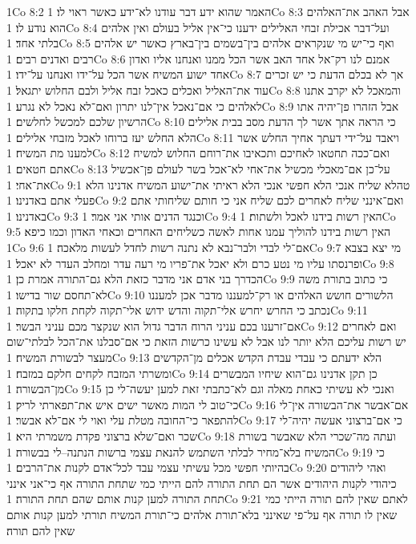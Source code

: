 1Co 8:2  האמר שהוא ידע דבר עודנו לא־ידע כאשר ראוי לו׃
1Co 8:3  אבל האהב את־האלהים הוא נודע לו׃
1Co 8:4  ועל־דבר אכילת זבחי האלילים ידענו כי־אין אליל בעולם ואין אלהים בלתי אחד׃
1Co 8:5  ואף כי־יש מי שנקראים אלהים בין־בשמים בין־בארץ כאשר יש אלהים רבים ואדנים רבים׃
1Co 8:6  אמנם לנו רק־אל אחד האב אשר הכל ממנו ואנחנו אליו ואדון אחד ישוע המשיח אשר הכל על־ידו ואנחנו על־ידו׃
1Co 8:7  אך לא בכלם הדעת כי יש זכרים עוד את־האליל ואכלים כאכל זבח אליל ולבם החלוש יתגאל׃
1Co 8:8  והמאכל לא יקרב אתנו לאלהים כי אם־נאכל אין־לנו יתרון ואם־לא נאכל לא נגרע׃
1Co 8:9  אבל הזהרו פן־יהיה אתו הרשיון שלכם למכשל לחלשים׃
1Co 8:10  כי הראה אתך אשר לך הדעת מסב בבית אלילים הלא החלש יעז ברוחו לאכל מזבחי אלילים׃
1Co 8:11  ויאבד על־ידי דעתך אחיך החלש אשר למענו מת המשיח׃
1Co 8:12  ואם־ככה תחטאו לאחיכם ותכאיבו את־רוחם החלוש למשיח אתם חטאים׃
1Co 8:13  על־כן אם־מאכלי מכשיל את־אחי לא־אכל בשר לעולם פן־אכשיל את־אחי׃
1Co 9:1  טהלא שליח אנכי הלא חפשי אנכי הלא ראיתי את־ישוע המשיח אדנינו הלא פעלי אתם באדנינו׃
1Co 9:2  ואם־אינני שליח לאחרים לכם שליח אני כי חותם שליחותי אתם באדנינו׃
1Co 9:3  וכנגד הדנים אותי אני אמר׃
1Co 9:4  האין רשות בידנו לאכל ולשתות׃
1Co 9:5  האין רשות בידנו להוליך עמנו אחות לאשה כשליחים האחרים וכאחי האדון וכמו כיפא׃
1Co 9:6  אם־לי לבדי ולבר־נבא לא נתנה רשות לחדל לעשות מלאכה׃
1Co 9:7  מי יצא בצבא ופרנסתו עליו מי נטע כרם ולא יאכל את־פריו מי רעה עדר ומחלב העדר לא יאכל׃
1Co 9:8  הכדרך בני אדם אני מדבר כזאת הלא גם־התורה אמרת כן׃
1Co 9:9  כי כתוב בתורת משה לא־תחסם שור בדישו׃
1Co 9:10  הלשורים חושש האלהים או רק־למעננו מדבר אכן למעננו נכתב כי החרש יחרש אלי־תקוה והדש ידוש אלי־תקוה לקחת חלקו בתקוה׃
1Co 9:11  אם־זרענו בכם עניני הרוח הדבר גדול הוא שנקצר מכם עניני הבשר׃
1Co 9:12  ואם לאחרים יש רשות עליכם הלא יותר לנו אבל לא עשינו כרשות הזאת כי אם־סבלנו את־הכל לבלתי־שום מעצר לבשורת המשיח׃
1Co 9:13  הלא ידעתם כי עבדי עבדת הקדש אכלים מן־הקדשים ומשרתי המזבח לקחים חלקם במזבח׃
1Co 9:14  כן תקן אדנינו גם־הוא שיחיו המבשרים מן־הבשורה׃
1Co 9:15  ואנכי לא עשיתי כאחת מאלה וגם לא־כתבתי זאת למען יעשה־לי כן כי־טוב לי המות מאשר ישים איש את־תפארתי לריק׃
1Co 9:16  אם־אבשר את־הבשורה אין־לי להתפאר כי־החובה מטלת עלי ואוי לי אם־לא אבשר׃
1Co 9:17  כי אם־ברצוני אעשה יהיה־לי שכר ואם־שלא ברצוני פקדת משמרתי היא׃
1Co 9:18  ועתה מה־שכרי הלא שאבשר בשורת המשיח בלא־מחיר לבלתי השתמש להנאת עצמי ברשות הנתנה--לי בבשורה׃
1Co 9:19  כי בהיותי חפשי מכל עשיתי עצמי עבד לכל־אדם לקנות את־הרבים׃
1Co 9:20  ואהי ליהודים כיהודי לקנות היהודים אשר הם תחת התורה להם הייתי כמי שתחת התורה אף כי־אני אינני תחת התורה למען קנות אותם שהם תחת התורה׃
1Co 9:21  לאתם שאין להם תורה הייתי כמי שאין לו תורה אף על־פי שאינני בלא־תורת אלהים כי־תורת המשיח תורתי למען קנות אותם שאין להם תורה׃
